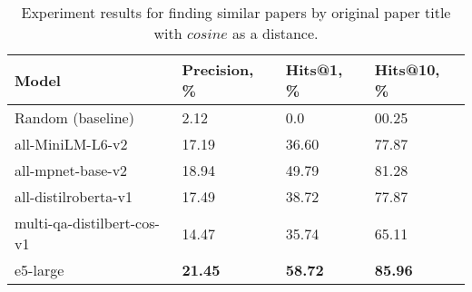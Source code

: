 \begin{table}
    \small
    \centering
    \caption{Experiment results for finding similar papers by original paper title with \(cosine\) as a distance.}
    \label{tab:experiments:title-cos}
    \bigskip
    \begin{tabularx}{0.99\textwidth}{XIII}

        \toprule

        \bfseries Model & \bfseries Precision, \% & \bfseries Hits@1, \% & \bfseries Hits@10, \% \\

        \midrule
        
        Random (baseline)		                & 2.12  &  0.0  &    00.25 \\
        
        \midrule
        
        all-MiniLM-L6-v2	        & 17.19 & 36.60	   &	77.87 \\
        all-mpnet-base-v2	        & 18.94 & 49.79	   &	81.28 \\
        all-distilroberta-v1	    & 17.49 & 38.72	   &	77.87 \\
        multi-qa-distilbert-cos-v1	& 14.47 & 35.74	   &	65.11 \\
        e5-large	                & \bfseries 21.45 & \bfseries 58.72 &	\bfseries 85.96 \\

        \bottomrule

    \end{tabularx}
\end{table}

